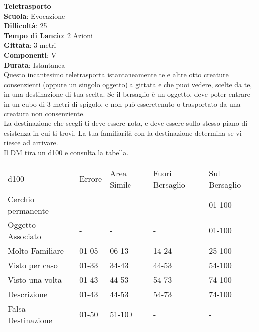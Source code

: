 \begin{multicols}{2}
\medskip\textbf{Teletrasporto}\\
\textbf{Scuola}: Evocazione\\
\textbf{Difficoltà}:  25\\
\textbf{Tempo di Lancio}: 2 Azioni\\
\textbf{Gittata}: 3 metri\\
\textbf{Componenti}: V\\
\textbf{Durata}: Istantanea\\
Questo incantesimo teletrasporta istantaneamente te e altre otto creature consenzienti (oppure un singolo oggetto) a gittata e che puoi vedere, scelte da te, in una destinazione di tua scelta. Se il bersaglio è un oggetto, deve poter entrare in un cubo di 3 metri di spigolo, e non può esseretenuto o trasportato da una creatura  non consenziente.\\
La destinazione che scegli ti deve essere nota, e deve essere sullo stesso piano di esistenza in cui ti trovi. La tua familiarità con la destinazione determina se vi riesce ad arrivare.\\
Il DM tira un d100 e consulta la tabella.
\end{multicols}
\medskip
\begin{tabular}{lllll}
\toprule
d100 				&	Errore		&	Area Simile	&Fuori Bersaglio&Sul Bersaglio\\
Cerchio permanente	&-	&-	&-	&01-100\\
Oggetto Associato	&-	&-	&-	&01-100\\
Molto Familiare		&01-05	&06-13	&14-24	&25-100\\
Visto per caso		&01-33	&34-43	&44-53	&54-100\\
Visto una volta		&01-43	&44-53	&54-73	&74-100\\
Descrizione			&01-43	&44-53	&54-73	&74-100\\
Falsa Destinazione	&01-50	&51-100	&-	&-\\
\end{tabular}
\medskip

